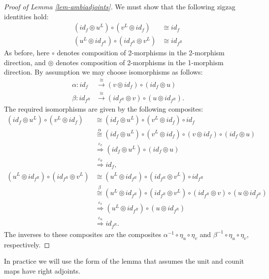 \documentclass{amsart}
\begin{document}
\begin{proof}[Proof of Lemma \ref{lem-ambiadjoints}]
We must show that the following zigzag identities hold:
\begin{align*}
	 (id_{f} \circledcirc u^L) \circ (v^L \circledcirc id_{f} ) & \cong id_{f} \\
 	 (u^L \circledcirc id_{f^R}) \circ (id_{f^R} \circledcirc v^L) & \cong id_{f^R} 
\end{align*}
As before, here $\circ$ denotes composition of 2-morphisms in the 2-morphism direction, and $\circledcirc$ denotes composition of 2-morphisms in the 1-morphism direction.
By assumption we may choose isomorphisms as follows:
\begin{align*}
	\alpha: id_f &\stackrel{\cong}{\to} (v \circledcirc id_f) \circ (id_f \circledcirc u) \\
	\beta: id_{f^R} &\stackrel{\cong}{\to} (id_{f^R} \circledcirc v) \circ (u \circledcirc id_{f^R} ).
\end{align*}
The required isomorphisms are given by the following composites:
\begin{align*}
	(id_{f} \circledcirc u^L) \circ (v^L \circledcirc id_{f} )
		& \cong (id_{f} \circledcirc u^L) \circ (v^L \circledcirc id_{f} ) \circ id_f\\
		& \stackrel{\alpha}{\cong} (id_{f} \circledcirc u^L) \circ (v^L \circledcirc id_{f} ) \circ (v \circledcirc id_f) \circ (id_f \circledcirc u) \\
		&  \stackrel{\varepsilon_v }{\Rightarrow} (id_{f} \circledcirc u^L) \circ (id_f \circledcirc u) \\
		& \stackrel{\varepsilon_u }{\Rightarrow} id_{f},  \\
	(u^L \circledcirc id_{f^R}) \circ (id_{f^R} \circledcirc v^L) 
		& \cong  (u^L \circledcirc id_{f^R}) \circ (id_{f^R} \circledcirc v^L) \circ id_{f^R} \\
		& \stackrel{\beta}{\cong}  (u^L \circledcirc id_{f^R}) \circ (id_{f^R} \circledcirc v^L) \circ (id_{f^R} \circledcirc v) \circ (u \circledcirc id_{f^R} ) \\
		& \stackrel{\varepsilon_v }{\Rightarrow} (u^L \circledcirc id_{f^R}) \circ (u \circledcirc id_{f^R} ) \\
		& \stackrel{\varepsilon_u }{\Rightarrow} id_{f^R}.
\end{align*}
The inverses to these composites are the composites $\alpha^{-1} \circ \eta_u \circ \eta_v$ and $\beta^{-1} \circ \eta_u \circ \eta_v$, respectively.
\end{proof}

In practice we will use the form of the lemma that assumes the unit and counit maps have right adjoints.
\end{document}
